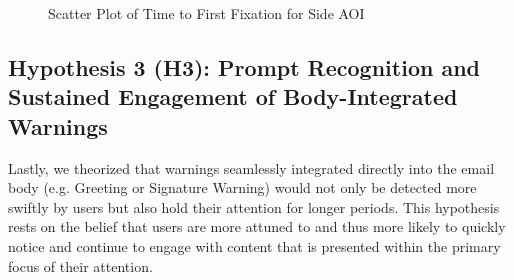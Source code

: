 \documentclass[
  a4paper,  %
  twoside,  %
  bibliography=totoc,
  headsepline,
  cleardoublepage=empty,
  parskip=half,
  draft=false
]{scrbook}
\begin{document}
\begin{figure}[H]
\centering
{}
\caption{Scatter Plot of Time to First Fixation for Side AOI}
\end{figure}

\subsection{Hypothesis 3 (H3): Prompt Recognition and Sustained Engagement of Body-Integrated Warnings}
Lastly, we theorized that warnings seamlessly integrated directly into the email body (e.g. Greeting or Signature Warning) would not only be detected more swiftly by users but also hold their attention for longer periods. This hypothesis rests on the belief that users are more attuned to and thus more likely to quickly notice and continue to engage with content that is presented within the primary focus of their attention.
\end{document}
